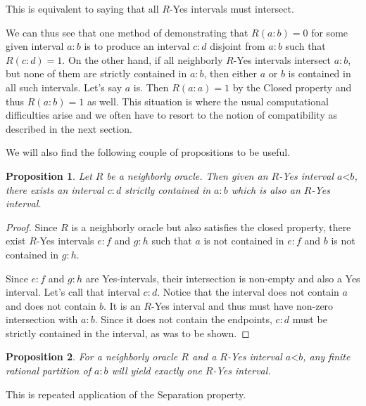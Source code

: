 \documentclass[12pt]{article}
\newtheorem{proposition}{Proposition}[subsection]
\theoremstyle{remark}
\newcommand{\lt}{\mathord{<}}
\begin{document}
This is equivalent to saying that all $R$-Yes intervals must intersect. 

We can thus see that one method of demonstrating that $R(a:b)=0$ for some given interval $a:b$ is to produce an interval $c:d$ disjoint from $a:b$ such that $R(c:d)=1$. On the other hand, if all neighborly $R$-Yes intervals intersect $a:b$, but none of them are strictly contained in $a:b$, then either $a$ or $b$ is contained in all such intervals. Let's say $a$ is. Then $R(a:a)=1$ by the Closed property and thus $R(a:b)=1$ as well. This situation is where the usual computational difficulties arise and we often have to resort to the notion of compatibility as described in the next section. 

We will also find the following couple of propositions to be useful. 

\begin{proposition}\label{pr:subinter}
Let $R$ be a neighborly oracle. Then given an $R$-Yes interval $a\lt b$, there exists an interval $c:d$ strictly contained in $a:b$ which is also an $R$-Yes interval. 
\end{proposition}

\begin{proof}
Since $R$ is a neighborly oracle but also satisfies the closed property, there exist $R$-Yes intervals $e:f$ and $g:h$ such that $a$ is not contained in $e:f$ and $b$ is not contained in $g:h$. 

Since $e:f$ and $g:h$ are Yes-intervals, their intersection is non-empty and also a Yes interval. Let's call that interval $c:d$.  Notice that the interval does not contain $a$ and does not contain $b$. It is an $R$-Yes interval and thus must have non-zero intersection with $a:b$. Since it does not contain the endpoints, $c:d$ must be strictly contained in the interval, as was to be shown. 
\end{proof}

\begin{proposition}\label{pr:multi}
For a neighborly oracle $R$ and a $R$-Yes interval $a\lt b$, any finite rational partition of $a:b$ will yield exactly one $R$-Yes interval. 
\end{proposition}

This is repeated application of the Separation property. 
\end{document}
